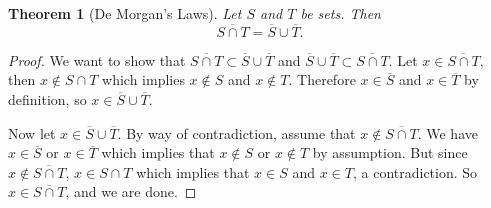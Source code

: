 \documentclass{article}
\newtheorem{theorem}{Theorem}
\begin{document}
% 
% 

\begin{theorem}[De Morgan's Laws]
     Let $S$ and $T$ be sets. Then 
     \[
     \overline{S \cap  T} = \overline{S} \cup \overline{T}.
     \]
\end{theorem}

\begin{proof}
    We want to show that $\overline{S \cap T} \subset \overline{S} \cup \overline{T}$ and $\overline{S} \cup \overline{T} \subset \overline{S \cap T}.$ 
    Let $x \in \overline{S \cap T},$ then $x \notin S \cap T$ which implies $x \notin S$ and $x \notin T$. Therefore  $x \in \overline{S}$ and $x \in \overline{T}$ by definition, so $x \in \overline{S} \cup \overline{T}.$

    Now let $x \in \overline{S} \cup \overline{T}.$ By way of contradiction, assume that $x \notin \overline{S \cap T}.$ We have $x \in \overline{S}$ or $x \in \overline{T }$ which implies that $x \notin S$ or $x \notin T$ by assumption. But since $x \notin \overline{S \cap T}$, $x \in S \cap T$ which implies that $x \in S$ and $x \in T$, a contradiction. So $x \in \overline{S \cap T}$, and we are done.

\end{proof}
    
\end{document}
